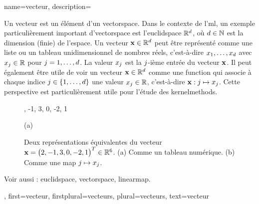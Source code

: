 {name={vecteur},
	description={
		Un vecteur est un élément d’un \gls{vectorspace}. 
		Dans le contexte de l’\gls{ml}, un exemple particulièrement important d’\gls{vectorspace} 
		est l’\gls{euclidspace} $\mathbb{R}^{d}$, où $d \in \mathbb{N}$ 
		est la dimension (finie) de l’espace. Un vecteur ${\bf x} \in \mathbb{R}^{d}$ 
		peut être représenté comme une liste ou un tableau unidimensionnel de nombres réels, c’est-à-dire 
		$x_1, \ldots, x_{d}$ avec $x_j \in \mathbb{R}$ pour 
		$j = 1, \ldots, d$. La valeur $x_j$ est la $j$-ième entrée du vecteur ${\bf x}$. Il peut également être utile de voir un vecteur ${\bf x} \in \mathbb{R}^{d}$ 
		comme une \gls{function} qui associe à chaque indice $j \in \{1, \ldots, d\}$ 
		une valeur $x_j \in \mathbb{R}$, c’est-à-dire ${\bf x}: j \mapsto x_j$. 
		Cette perspective est particulièrement utile pour l’étude des \glspl{kernelmethod}.
		\begin{figure}[H]
			\begin{minipage}[c]{0.48\textwidth}
				, -1, 3, 0, -2, 1
				\begin{minipage}{\textwidth}
					\vspace{5ex}
					\centering
					{\selectfont (a)}
				\end{minipage}
			\end{minipage}
			\hfill
			\begin{minipage}{0.48\textwidth}
				\centering
			\end{minipage}
			\caption{Deux représentations équivalentes du vecteur ${\bf x}= \big( 2, -1, 3, 0, -2, 1 \big)^{T} \in \mathbb{R}^{6}$.
				(a) Comme un tableau numérique. (b) Comme une \gls{map} $j \mapsto x_j$.}
			\label{fig:vector-function-dual_dict}
		\end{figure}
		Voir aussi : \gls{euclidspace}, \gls{vectorspace}, \gls{linearmap}.},
	first={vecteur},
	firstplural={vecteurs},
	plural={vecteurs},
	text={vecteur}
}

